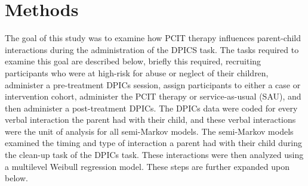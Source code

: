 \documentclass[12pt]{./styles/outhesis}
\begin{document}
\section{Methods}
The goal of this study was to examine how PCIT therapy influences
parent-child interactions during the administration of the DPICS task.
The tasks required to examine this goal are described below, briefly
this required, recruiting participants who were at high-risk for abuse
or neglect of their children, administer a pre-treatment DPICs session,
assign participants to either a case or intervention cohort, administer
the PCIT therapy or service-as-usual (SAU), and then administer a
post-treatment DPICs. The DPICs data were coded for every verbal
interaction the parent had with their child, and these verbal
interactions were the unit of analysis for all semi-Markov models. The
semi-Markov models examined the timing and type of interaction a parent
had with their child during the clean-up task of the DPICs task. These
interactions were then analyzed using a multilevel Weibull regression
model. These steps are further expanded upon below.
\end{document}
